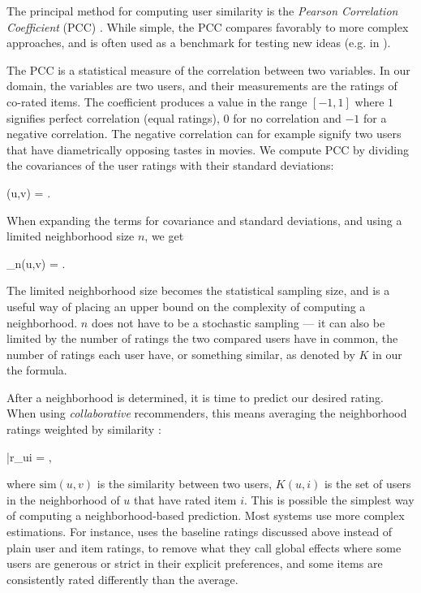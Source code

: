 The principal method for computing user similarity is the \emph{Pearson Correlation Coefficient} (PCC)
\cite[p11]{Segaran2007}.
While simple, the PCC compares favorably to more complex approaches, and is often used as a benchmark 
for testing new ideas (e.g. in \citet{Lemire2005, Ujjin, Konstas}).

The PCC is a statistical measure of the correlation between two variables. In our domain, the variables
are two users, and their measurements are the ratings of co-rated items. 
The coefficient produces a value in the range $[-1,1]$ where $1$ signifies perfect correlation (equal ratings),
$0$ for no correlation and $-1$ for a negative correlation.
The negative correlation can for example signify two users that have diametrically opposing tastes in movies.
We compute PCC by dividing the covariances of the user ratings with their standard deviations:

\begin{eqsp}
  (u,v) = .
\end{eqsp}
%
When expanding the terms for covariance and standard deviations, 
and using a limited neighborhood size $n$, we get

\begin{eqsp}
  _{n}(u,v) = 
    .
\end{eqsp}
%
The limited neighborhood size becomes the statistical sampling size, and is a useful
way of placing an upper bound on the complexity of computing a neighborhood.
$n$ does not have to be a stochastic sampling --- it can also be limited by the number of ratings 
the two compared users have in common, the number of ratings each user have, or something similar,
as denoted by $K$ in our the formula.

After a neighborhood is determined, it is time to predict our desired rating.
When using \emph{collaborative} recommenders, this means averaging the neighborhood ratings weighted by similarity \cite[p16]{Segaran2007}:

\begin{eqsp}
  \bar{r}_{ui} = ,
\end{eqsp}
%
where $\mathrm{sim}(u,v)$ is the similarity between two users, $K(u,i)$ is the set of users in the neighborhood of $u$ that have rated item $i$.
This is possible the simplest way of computing a neighborhood-based prediction.
Most systems use more complex estimations. For instance, \cite{Koren2008} 
uses the baseline ratings discussed above instead of plain user and item ratings, to
remove what they call global effects where some users are generous or strict in their 
explicit preferences, and some items are consistently rated differently than the average.

